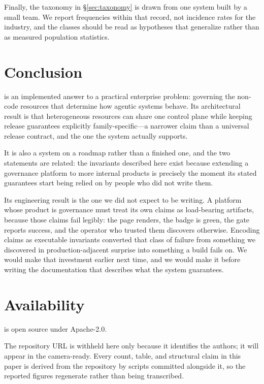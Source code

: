 \documentclass{article}
\newif\ifcameraready
\begin{document}
Finally, the taxonomy in \S\ref{sec:taxonomy} is drawn from one system built by a
small team. We report frequencies within that record, not incidence rates for the
industry, and the classes should be read as hypotheses that generalize rather than
as measured population statistics.

\section{Conclusion}

\sys is an implemented answer to a practical enterprise problem: governing the
non-code resources that determine how agentic systems behave. Its architectural
result is that heterogeneous resources can share one control plane while keeping
release guarantees explicitly family-specific---a narrower claim than a universal
release contract, and the one the system actually supports.

It is also a system on a roadmap rather than a finished one, and the two
statements are related: the invariants described here exist because extending a
governance platform to more internal products is precisely the moment its stated
guarantees start being relied on by people who did not write them.

Its engineering result is the one we did not expect to be writing. A platform whose
product is governance must treat its own claims as load-bearing artifacts, because
those claims fail legibly: the page renders, the badge is green, the gate reports
success, and the operator who trusted them discovers otherwise. Encoding claims as
executable invariants converted that class of failure from something we discovered
in production-adjacent surprise into something a build fails on. We would make that
investment earlier next time, and we would make it before writing the documentation
that describes what the system guarantees.

\section*{Availability}

\sys is open source under Apache-2.0.
\ifcameraready
The repository, including the continuous-integration configuration that produces
every figure and count in this paper, is at
\url{https://github.com/rrahimi-uci/caliber-suite}.
\else
The repository URL is withheld here only because it identifies the authors; it will
appear in the camera-ready. Every count, table, and structural claim in this paper is
derived from the repository by scripts committed alongside it, so the reported
figures regenerate rather than being transcribed.
\fi



\end{document}
